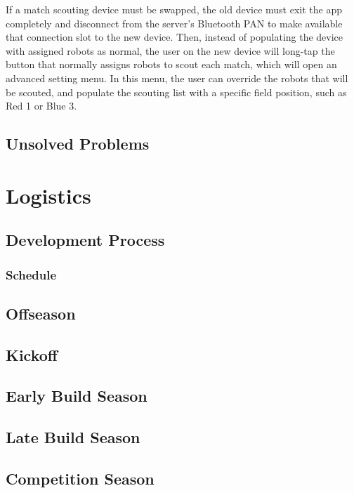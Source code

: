 \documentclass[11pt]{report}
\begin{document}
If a match scouting device must be swapped, the old device must exit the app completely and disconnect from the server's Bluetooth PAN to make available that connection slot to the new device. Then, instead of populating the device with assigned robots as normal, the user on the new device will long-tap the button that normally assigns robots to scout each match, which will open an advanced setting menu. In this menu, the user can override the robots that will be scouted, and populate the scouting list with a specific field position, such as Red 1 or Blue 3.

\section{Unsolved Problems}


\chapter{Logistics}

\section{Development Process}
\subsection{Schedule}


\section{Offseason}
\section{Kickoff}
\section{Early Build Season}
\section{Late Build Season}
\section{Competition Season}
\end{document}
